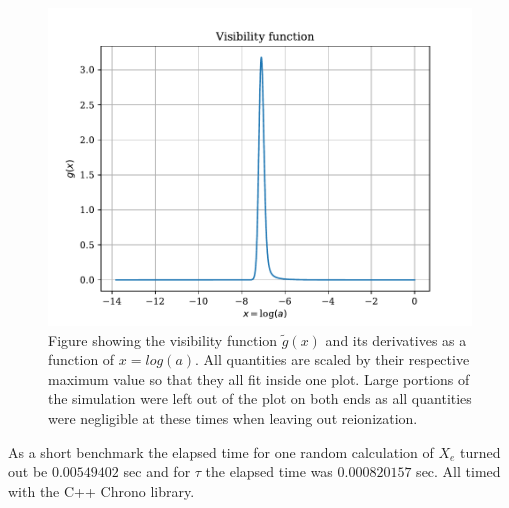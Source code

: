 \documentclass[onecolumn]{aastex62}
\begin{document}
\begin{figure}
    \includegraphics[scale=0.8]{figures/g.pdf}
    \caption{Figure showing the visibility function $\widetilde{g}(x)$ and its derivatives as a function of $x=log(a)$. All quantities are scaled by their respective maximum value so that they all fit inside one plot. Large portions of the simulation were left out of the plot on both ends as all quantities were negligible at these times when leaving out reionization.}
    \label{fig:g}
\end{figure}

As a short benchmark the elapsed time for one random calculation of $X_e$ turned out be $0.00549402$ sec and for $\tau$ the elapsed time was $0.000820157$ sec. All timed with the C++ Chrono library.
\end{document}
